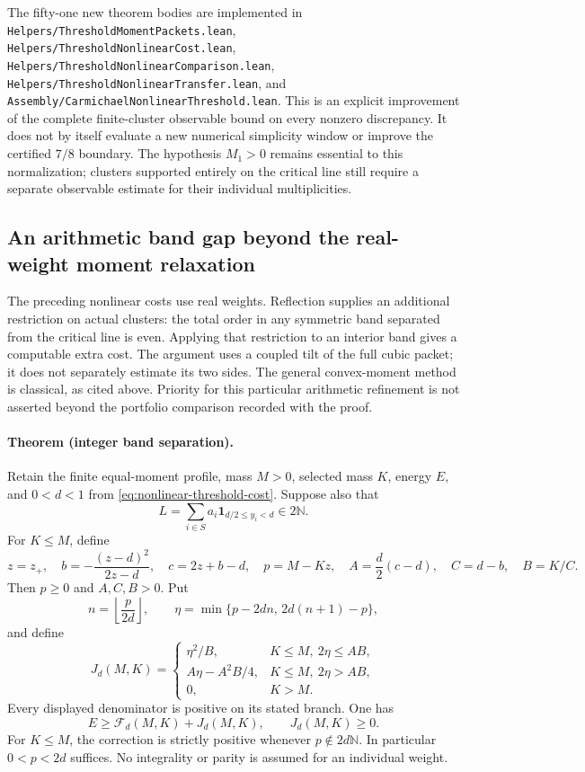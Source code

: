 The fifty-one new theorem bodies are implemented in
\texttt{Helpers/ThresholdMomentPackets.lean},
\texttt{Helpers/ThresholdNonlinearCost.lean},
\texttt{Helpers/ThresholdNonlinearComparison.lean},
\texttt{Helpers/ThresholdNonlinearTransfer.lean}, and
\texttt{Assembly/CarmichaelNonlinearThreshold.lean}.
This is an explicit improvement of the complete finite-cluster observable
bound on every nonzero discrepancy.  It does not by itself evaluate a new
numerical simplicity window or improve the certified \(7/8\) boundary.
The hypothesis \(M_1>0\) remains essential to this normalization; clusters
supported entirely on the critical line still require a separate observable
estimate for their individual multiplicities.

\subsection{An arithmetic band gap beyond the real-weight moment relaxation}
\label{sec:threshold-integer-band}

The preceding nonlinear costs use real weights.  Reflection supplies an
additional restriction on actual clusters: the total order in any symmetric
band separated from the critical line is even.  Applying that restriction to
an interior band gives a computable extra cost.  The argument uses a coupled
tilt of the full cubic packet; it does not separately estimate its two sides.
The general convex-moment method is classical, as cited above.  Priority for
this particular arithmetic refinement is not asserted beyond the portfolio
comparison recorded with the proof.

\paragraph{Theorem (integer band separation).}
Retain the finite equal-moment profile, mass \(M>0\), selected mass \(K\),
energy \(E\), and \(0<d<1\) from
\eqref{eq:nonlinear-threshold-cost}.  Suppose also that
\[
 L=\sum_{i\in S}a_i\mathbf1_{d/2\le y_i<d}\in2\mathbb N.
\]
For \(K\le M\), define
\[
 z=z_+,\quad b=-\frac{(z-d)^2}{2z-d},\quad c=2z+b-d,\quad
 p=M-Kz,\quad A=\frac d2(c-d),\quad C=d-b,\quad B=K/C.
\]
Then \(p\ge0\) and \(A,C,B>0\).  Put
\[
 n=\left\lfloor\frac{p}{2d}\right\rfloor,\qquad
 \eta=\min\{p-2dn,\,2d(n+1)-p\},
\]
and define
\begin{equation}
 J_d(M,K)=
 \begin{cases}
 \eta^2/B,&K\le M,\ 2\eta\le AB,\\
 A\eta-A^2B/4,&K\le M,\ 2\eta>AB,\\
 0,&K>M.
 \end{cases}
 \label{eq:threshold-integer-band-cost}
\end{equation}
Every displayed denominator is positive on its stated branch.  One has
\begin{equation}
 E\ge\mathcal F_d(M,K)+J_d(M,K),\qquad J_d(M,K)\ge0.
 \label{eq:threshold-integer-band-bound}
\end{equation}
For \(K\le M\), the correction is strictly positive whenever
\(p\notin2d\mathbb N\).  In particular \(0<p<2d\) suffices.
No integrality or parity is assumed for an individual weight.

